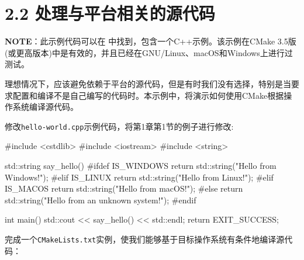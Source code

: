 \section{2.2 处理与平台相关的源代码}

\begin{myInfoBox}
\textbf{NOTE}：此示例代码可以在  中找到，包含一个C++示例。该示例在CMake 3.5版(或更高版本)中是有效的，并且已经在GNU/Linux、macOS和Windows上进行过测试。
\end{myInfoBox}

理想情况下，应该避免依赖于平台的源代码，但是有时我们没有选择，特别是当要求配置和编译不是自己编写的代码时。本示例中，将演示如何使用CMake根据操作系统编译源代码。


修改\texttt{hello-world.cpp}示例代码，将第1章第1节的例子进行修改:

\begin{codebox}[cpp]
#include <cstdlib>
#include <iostream>
#include <string>

std::string say_hello() {
#ifdef IS_WINDOWS
  return std::string("Hello from Windows!");
#elif IS_LINUX
  return std::string("Hello from Linux!");
#elif IS_MACOS
  return std::string("Hello from macOS!");
#else
  return std::string("Hello from an unknown system!");
#endif
}

int main() {
  std::cout << say_hello() << std::endl;
  return EXIT_SUCCESS;
}
\end{codebox}


完成一个\texttt{CMakeLists.txt}实例，使我们能够基于目标操作系统有条件地编译源代码：

